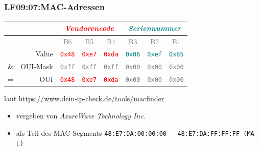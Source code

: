 
\begin{frame}  
  \frametitle{LF09:07:MAC-Adressen}

  \begin{small}
  \begin{center}
    \renewcommand{\arraystretch}{1.5}
    \begin{tabular}{| r  r || c | c | c || c | c | c |}
      \hline
       &  & \multicolumn{3}{c||}{\tiny{\textit{\textrm{\textcolor{red}{Vendorencode}}}}} 
            & \multicolumn{3}{c|}{{\tiny{\textit{\textrm{\textcolor{teal}{Seriennummer}}}}}} \\
      \hline
       &  & \textcolor{gray}{\tiny{B6}} & \textcolor{gray}{\tiny{B5}} & \textcolor{gray}{\tiny{B4}} 
          & \textcolor{gray}{\tiny{B3}} & \textcolor{gray}{\tiny{B2}} & \textcolor{gray}{\tiny{B1}}  \\
      \hline
       & Value & \textcolor{red}{\texttt{0x48}} & \textcolor{red}{\texttt{0xe7}} & \textcolor{red}{\texttt{0xda}}
            & \textcolor{teal}{\texttt{0x06}} & \textcolor{teal}{\texttt{0xef}}  & \textcolor{teal}{\texttt{0x85}} \\
      \hline
      \& & OUI-Mask & \textcolor{gray}{\texttt{0xff}} & \textcolor{gray}{\texttt{0xff}} & \textcolor{gray}{\texttt{0xff}}
            & \textcolor{gray}{\texttt{0x00}} & \textcolor{gray}{\texttt{0x00}}  & \textcolor{gray}{\texttt{0x00}} \\
      \hline
      \hline
      = & OUI & \textcolor{red}{\texttt{0x48}} & \textcolor{red}{\texttt{0xe7}} & \textcolor{red}{\texttt{0xda}}
            & \textcolor{gray}{\texttt{0x00}} & \textcolor{gray}{\texttt{0x00}}  & \textcolor{gray}{\texttt{0x00}} \\
      \hline

    \end{tabular}
  \end{center}
\end{small}
  
\vspace{1cm}
\begin{footnotesize}

laut \href{https://www.dein-ip-check.de/tools/macfinder?oui=48\%3Ae7\%3Ada\%3A06\%3Aef\%3A85}{https://www.dein-ip-check.de/tools/macfinder} 
\begin{itemize}
  \item vergeben von \textit{AzureWave Technology Inc.} 
  \item als Teil des MAC-Segments \texttt{48:E7:DA:00:00:00 - 48:E7:DA:FF:FF:FF (MA-L)}
\end{itemize}
\end{footnotesize}


\end{frame}
